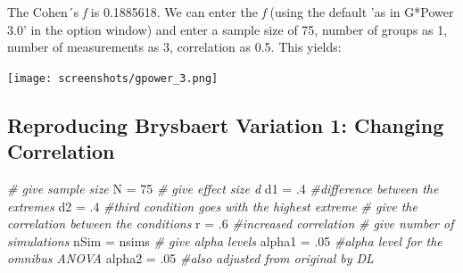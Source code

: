 \documentclass[
]{book}
\newenvironment{Shaded}{\begin{snugshade}}{\end{snugshade}}
\newcommand{\CommentTok}[1]{\textcolor[rgb]{0.56,0.35,0.01}{\textit{#1}}}
\newcommand{\DecValTok}[1]{\textcolor[rgb]{0.00,0.00,0.81}{#1}}
\newcommand{\NormalTok}[1]{#1}
\newcommand{\OtherTok}[1]{\textcolor[rgb]{0.56,0.35,0.01}{#1}}
\begin{document}
The Cohen´s \emph{f} is 0.1885618. We can enter the \emph{f} (using the default 'as in G*Power 3.0' in the option window) and enter a sample size of 75, number of groups as 1, number of measurements as 3, correlation as 0.5. This yields:

\texttt{[image: screenshots/gpower\_3.png]}

\hypertarget{reproducing-brysbaert-variation-1-changing-correlation}{%
\subsection{Reproducing Brysbaert Variation 1: Changing Correlation}\label{reproducing-brysbaert-variation-1-changing-correlation}}

\begin{Shaded}
\begin{Highlighting}[]
\CommentTok{\# give sample size}
\NormalTok{N }\OtherTok{=} \DecValTok{75}
\CommentTok{\# give effect size d}
\NormalTok{d1 }\OtherTok{=}\NormalTok{ .}\DecValTok{4} \CommentTok{\#difference between the extremes}
\NormalTok{d2 }\OtherTok{=}\NormalTok{ .}\DecValTok{4} \CommentTok{\#third condition goes with the highest extreme}
\CommentTok{\# give the correlation between the conditions}
\NormalTok{r }\OtherTok{=}\NormalTok{ .}\DecValTok{6} \CommentTok{\#increased correlation}
\CommentTok{\# give number of simulations}
\NormalTok{nSim }\OtherTok{=}\NormalTok{ nsims}
\CommentTok{\# give alpha levels}
\NormalTok{alpha1 }\OtherTok{=}\NormalTok{ .}\DecValTok{05} \CommentTok{\#alpha level for the omnibus ANOVA}
\NormalTok{alpha2 }\OtherTok{=}\NormalTok{ .}\DecValTok{05} \CommentTok{\#also adjusted from original by DL}
\end{Highlighting}
\end{Shaded}
\end{document}
